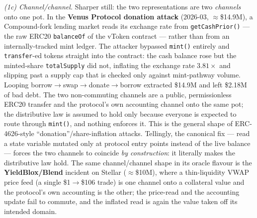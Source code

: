 \documentclass[11pt]{amsart}
\theoremstyle{definition}
\theoremstyle{remark}
\newcommand{\ra}{\rightarrow}
\begin{document}
\emph{(1c) Channel/channel.} Sharper still: the two representations are two \emph{channels} onto
one pot. In the \textbf{Venus Protocol donation attack} (2026-03, $\approx$\$14.9M), a
Compound-fork lending market reads its exchange rate from \texttt{getCashPrior()} --- the raw
ERC20 \texttt{balanceOf} of the vToken contract --- rather than from an internally-tracked mint
ledger. The attacker bypassed \texttt{mint()} entirely and \texttt{transfer}-ed tokens straight
into the contract: the cash balance rose but the minted-share \texttt{totalSupply} did not,
inflating the exchange rate $3.81\times$ and slipping past a supply cap that is checked only
against mint-pathway volume. Looping borrow$\ra$swap$\ra$donate$\ra$borrow extracted \$14.9M and
left \$2.18M of bad debt. The two non-commuting channels are a public, permissionless ERC20
transfer and the protocol's own accounting channel onto the same pot; the distributive law is
assumed to hold only because everyone is expected to route through \texttt{mint()}, and nothing
enforces it. This is the general shape of ERC-4626-style ``donation''/share-inflation attacks.
Tellingly, the canonical fix --- read a state variable mutated only at protocol entry points
instead of the live balance --- forces the two channels to coincide \emph{by construction}: it
literally makes the distributive law hold. The same channel/channel shape in its oracle flavour is
the \textbf{YieldBlox/Blend} incident on Stellar ($\approx$\$10M), where a thin-liquidity VWAP
price feed (a single \$1$\ra$\$106 trade) is one channel onto a collateral value and the
protocol's own accounting is the other; the price-read and the accounting update fail to commute,
and the inflated read is again the value taken off its intended domain.
\end{document}
